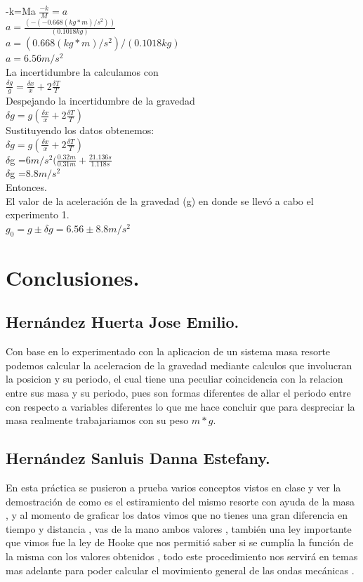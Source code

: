 \documentclass[10pt]{article}
\begin{document}
\begin{multicols}{2}
-k=Ma
$\frac{-k}{M}=a$\\
$a=\frac{(-(-0.668 (kg*m)/s^2 ) )}{(0.1018 kg)}$\\
$a=(0.668  (kg*m)/s^2 )/(0.1018 kg)$\\
$a=6.56 m/s^2 $ \\
La incertidumbre la calculamos con \\
$\frac{\delta g} {g}= \frac{\delta x }{x}+2\frac{ \delta T} {T}$\\
Despejando la incertidumbre de la gravedad \\
$\delta g =g( \frac{\delta x} {x}+2 \frac{\delta T} {T})$\\
Sustituyendo los datos obtenemos: \\
$\delta g =g(\frac{ \delta x}{x}+2 \frac{\delta T}{T})$\\
$\delta$g =$6m/s^2 (\frac{0.32m}{0.31m}+\frac{2 1.136s}{1.118s}$\\
$\delta$g =$8.8 m/s^2 $\\
Entonces. \\
El valor de la aceleración de la gravedad (g) en donde se llevó a cabo el experimento 1. \\
$g_{0} =g \pm \delta g=6.56 \pm 8.8 m/s^2 $\\


\section{Conclusiones.}

\subsection*{Hernández Huerta Jose Emilio.}
Con base en lo experimentado con la aplicacion de un sistema masa resorte podemos calcular la aceleracion de la gravedad mediante calculos que involucran la posicion y su periodo, el cual tiene una peculiar coincidencia con la relacion entre sus masa y su periodo, pues son formas diferentes de allar el periodo entre con respecto a variables diferentes lo que me hace concluir que para despreciar la masa realmente trabajariamos con su peso $m*g$.
\subsection*{Hernández Sanluis Danna Estefany.}
En esta práctica se pusieron a prueba varios conceptos vistos en clase y ver la demostración de como es el estiramiento del mismo resorte con ayuda de la masa , y al momento de graficar los datos vimos que no tienes una gran diferencia en tiempo y distancia , vas de la mano ambos valores , también una ley importante que vimos fue la ley de Hooke que nos permitió saber si se cumplía la función de la misma con los valores obtenidos , todo este procedimiento nos servirá en temas mas adelante para poder calcular el movimiento general de las ondas mecánicas . 

\end{multicols}
\end{document}
